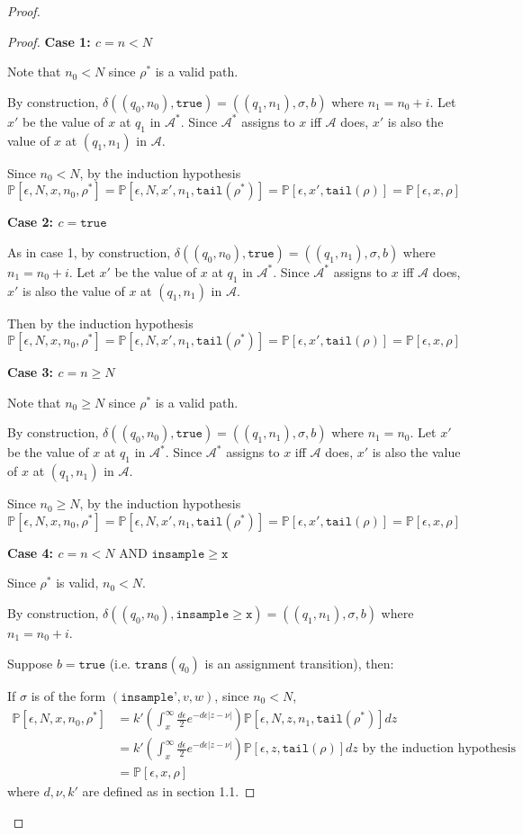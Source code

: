 \documentclass[12pt]{article}
\newcommand{\PP}{\mathbb{P}}
\newcommand{\gguard}{\texttt{insample}\geq \texttt{x}}
\newcommand{\gaguard}{n<N \text{ AND } \texttt{insample} \geq \texttt{x}}
\theoremstyle{definition}
\begin{document}
\begin{proof}
\begin{proof}
	\textbf{Case 1: $c = n < N$}

	Note that $ n_0 < N$ since $\rho^*$ is a valid path.
	
	By construction, $\delta((q_0, n_0), \texttt{true}) = ((q_1, n_1), \sigma, b)$ where $n_1 = n_0 + i$. Let $x'$ be the value of $x$ at $q_1$ in $\mathcal{A}^*$. Since $\mathcal{A}^*$ assigns to $x$ iff $\mathcal{A}$ does, $x'$ is also the value of $x$ at $(q_1, n_1)$ in $\mathcal{A}$.

	Since $n_0 < N$, by the induction hypothesis
		\[
			\PP[\epsilon, N, x, n_0, \rho^*] = \PP[\epsilon, N, x', n_1, \texttt{tail}(\rho^*)] = \PP[\epsilon, x', \texttt{tail}(\rho)] = \PP[\epsilon, x, \rho]
		\]

	\textbf{Case 2: $c = \texttt{true}$}

	As in case 1, by construction, $\delta((q_0, n_0), \texttt{true}) = ((q_1, n_1), \sigma, b)$ where $n_1 = n_0 + i$. Let $x'$ be the value of $x$ at $q_1$ in $\mathcal{A}^*$. Since $\mathcal{A}^*$ assigns to $x$ iff $\mathcal{A}$ does, $x'$ is also the value of $x$ at $(q_1, n_1)$ in $\mathcal{A}$.

	Then by the induction hypothesis
		\[
			\PP[\epsilon, N, x, n_0, \rho^*] = \PP[\epsilon, N, x', n_1, \texttt{tail}(\rho^*)] = \PP[\epsilon, x', \texttt{tail}(\rho)] = \PP[\epsilon, x, \rho]
		\]

	\textbf{Case 3: $c = n\geq N$}

	Note that $ n_0 \geq N$ since $\rho^*$ is a valid path.
	
	By construction, $\delta((q_0, n_0), \texttt{true}) = ((q_1, n_1), \sigma, b)$ where $n_1 = n_0$. Let $x'$ be the value of $x$ at $q_1$ in $\mathcal{A}^*$. Since $\mathcal{A}^*$ assigns to $x$ iff $\mathcal{A}$ does, $x'$ is also the value of $x$ at $(q_1, n_1)$ in $\mathcal{A}$.

	Since $n_0 \geq N$, by the induction hypothesis
		\[
			\PP[\epsilon, N, x, n_0, \rho^*] = \PP[\epsilon, N, x', n_1, \texttt{tail}(\rho^*)] = \PP[\epsilon, x', \texttt{tail}(\rho)] = \PP[\epsilon, x, \rho]
		\]

	\textbf{Case 4: $c = \gaguard$}

	Since $\rho^*$ is valid, $n_0 < N$. 

	By construction, $\delta((q_0, n_0), \gguard) = ((q_1, n_1), \sigma, b)$ where $n_1 = n_0+i$. 

	Suppose $b = \texttt{true}$ (i.e. $\texttt{trans}(q_0)$ is an assignment transition), then:

	If $\sigma$ is of the form $(\texttt{insample'}, v, w)$, since $n_0 < N$, 
		\begin{align*}
			\PP[\epsilon, N, x, n_0, \rho^*] &= k'\left(\int_x^\infty\frac{d\epsilon}{2}e^{-d\epsilon|z-\nu|}\right)\PP[\epsilon, N, z, n_1, \texttt{tail}(\rho^*)]dz \\
			&= k'\left(\int_x^\infty\frac{d\epsilon}{2}e^{-d\epsilon|z-\nu|}\right)\PP[\epsilon, z, \texttt{tail}(\rho)]dz \text{ by the induction hypothesis }\\
			&= \PP[\epsilon, x, \rho]
		\end{align*}
	where $d, \nu, k'$ are defined as in section 1.1.
	

\end{proof}
\end{proof}
\end{document}
